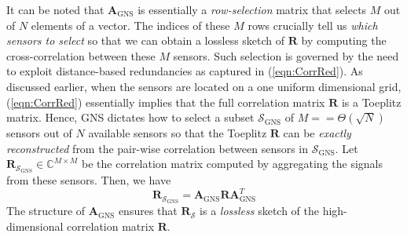 It can be noted that $\mathbf{A}_{\text{GNS}}$ is essentially a {\em row-selection} matrix that selects $M$ out of $N$ elements of a vector. The indices of these $M$ rows crucially tell us {\em which sensors to select} so that we can obtain a lossless sketch of $\mathbf{R}$ by computing the cross-correlation between these $M$ sensors. Such selection is governed by the need to exploit distance-based redundancies as captured in (\ref{eqn:CorrRed}). As discussed earlier, when the sensors are located on a one uniform dimensional grid, (\ref{eqn:CorrRed}) essentially implies that the full correlation matrix $\mathbf{R}$ is a Toeplitz matrix. %
Hence, GNS dictates how to select a subset $\mathcal{S}_{\text{GNS}}$ of $M =  = \Theta(\sqrt{N})$ sensors out of $N$ available sensors so that the Toeplitz $\mathbf{R}$ can be {\em exactly reconstructed} from the pair-wise correlation between sensors in $\mathcal{S}_{\text{GNS}}$. Let $\mathbf{R}_{\mathcal{S}_{\text{GNS}}} \in \mathbb{C}^{M\times M}$ be the correlation matrix computed by aggregating the signals from these sensors. Then, we have 
\begin{equation}
\mathbf{R}_{\mathcal{S}_{\text{GNS}}} = \mathbf{A}_{\text{GNS}} \mathbf{R} \mathbf{A}^T_{\text{GNS}} 
\end{equation}
The structure of $\mathbf{A}_{\text{GNS}}$ ensures that $\mathbf{R}_{\mathcal{S}}$ is a {\em lossless} sketch of the high-dimensional correlation matrix $\mathbf{R}$. 

